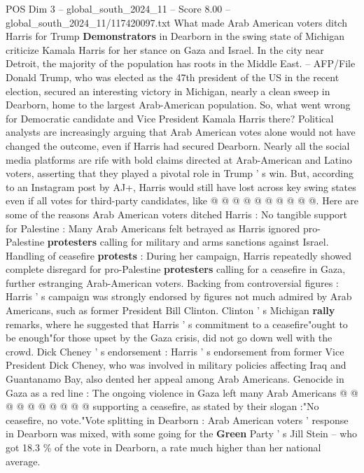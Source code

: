 \begin{textsample}{POS Dim 3 – global\_south\_2024\_11 – Score 8.00 – global\_south\_2024\_11/117420097.txt}  \label{ex:f3_pos_327}
What made Arab American voters ditch Harris for Trump \textbf{Demonstrators} in Dearborn in the swing state of Michigan criticize Kamala Harris for her stance on Gaza and Israel.
In the city near Detroit, the majority of the population has roots in the Middle East. -- AFP/File Donald Trump, who was elected as the 47th president of the US in the recent election, secured an interesting victory in Michigan, nearly a clean sweep in Dearborn, home to the largest Arab-American population.
So, what went wrong for Democratic candidate and Vice President Kamala Harris there?
Political analysts are increasingly arguing that Arab American votes alone would not have changed the outcome, even if Harris had secured Dearborn.
Nearly all the social media platforms are rife with bold claims directed at Arab-American and Latino voters, asserting that they played a pivotal role in Trump ' s win.
But, according to an Instagram post by AJ+, Harris would still have lost across key swing states even if all votes for third-party candidates, like @ @ @ @ @ @ @ @ @ @.
Here are some of the reasons Arab American voters ditched Harris : No tangible support for Palestine : Many Arab Americans felt betrayed as Harris ignored pro-Palestine \textbf{protesters} calling for military and arms sanctions against Israel.
Handling of ceasefire \textbf{protests} : During her campaign, Harris repeatedly showed complete disregard for pro-Palestine \textbf{protesters} calling for a ceasefire in Gaza, further estranging Arab-American voters.
Backing from controversial figures : Harris ' s campaign was strongly endorsed by figures not much admired by Arab Americans, such as former President Bill Clinton.
Clinton ' s Michigan \textbf{rally} remarks, where he suggested that Harris ' s commitment to a ceasefire"ought to be enough"for those upset by the Gaza crisis, did not go down well with the crowd.
Dick Cheney ' s endorsement : Harris ' s endorsement from former Vice President Dick Cheney, who was involved in military policies affecting Iraq and Guantanamo Bay, also dented her appeal among Arab Americans.
Genocide in Gaza as a red line : The ongoing violence in Gaza left many Arab Americans @ @ @ @ @ @ @ @ @ @ supporting a ceasefire, as stated by their slogan :"No ceasefire, no vote."Vote splitting in Dearborn : Arab American voters ' response in Dearborn was mixed, with some going for the \textbf{Green} Party ' s Jill Stein -- who got 18.3 \% of the vote in Dearborn, a rate much higher than her national average.

\end{textsample}
